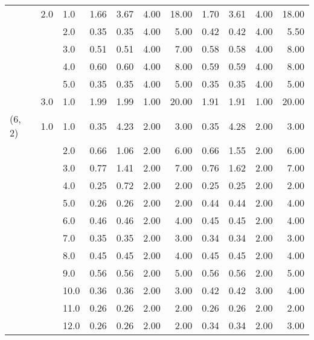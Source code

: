 \begin{tabular}{lllrrrrrrrr}
       & 2.0 & 1.0  &       1.66 &      3.67 & 4.00 &  18.00 &       1.70 &      3.61 & 4.00 &  18.00 \\
       &     & 2.0  &       0.35 &      0.35 & 4.00 &   5.00 &       0.42 &      0.42 & 4.00 &   5.50 \\
       &     & 3.0  &       0.51 &      0.51 & 4.00 &   7.00 &       0.58 &      0.58 & 4.00 &   8.00 \\
       &     & 4.0  &       0.60 &      0.60 & 4.00 &   8.00 &       0.59 &      0.59 & 4.00 &   8.00 \\
       &     & 5.0  &       0.35 &      0.35 & 4.00 &   5.00 &       0.35 &      0.35 & 4.00 &   5.00 \\
       & 3.0 & 1.0  &       1.99 &      1.99 & 1.00 &  20.00 &       1.91 &      1.91 & 1.00 &  20.00 \\
(6, 2) & 1.0 & 1.0  &       0.35 &      4.23 & 2.00 &   3.00 &       0.35 &      4.28 & 2.00 &   3.00 \\
       &     & 2.0  &       0.66 &      1.06 & 2.00 &   6.00 &       0.66 &      1.55 & 2.00 &   6.00 \\
       &     & 3.0  &       0.77 &      1.41 & 2.00 &   7.00 &       0.76 &      1.62 & 2.00 &   7.00 \\
       &     & 4.0  &       0.25 &      0.72 & 2.00 &   2.00 &       0.25 &      0.25 & 2.00 &   2.00 \\
       &     & 5.0  &       0.26 &      0.26 & 2.00 &   2.00 &       0.44 &      0.44 & 2.00 &   4.00 \\
       &     & 6.0  &       0.46 &      0.46 & 2.00 &   4.00 &       0.45 &      0.45 & 2.00 &   4.00 \\
       &     & 7.0  &       0.35 &      0.35 & 2.00 &   3.00 &       0.34 &      0.34 & 2.00 &   3.00 \\
       &     & 8.0  &       0.45 &      0.45 & 2.00 &   4.00 &       0.45 &      0.45 & 2.00 &   4.00 \\
       &     & 9.0  &       0.56 &      0.56 & 2.00 &   5.00 &       0.56 &      0.56 & 2.00 &   5.00 \\
       &     & 10.0 &       0.36 &      0.36 & 2.00 &   3.00 &       0.42 &      0.42 & 3.00 &   4.00 \\
       &     & 11.0 &       0.26 &      0.26 & 2.00 &   2.00 &       0.26 &      0.26 & 2.00 &   2.00 \\
       &     & 12.0 &       0.26 &      0.26 & 2.00 &   2.00 &       0.34 &      0.34 & 2.00 &   3.00 \\

\end{tabular}
